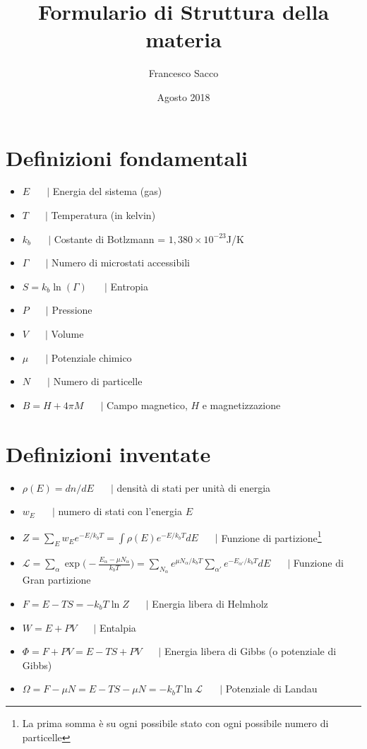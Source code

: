 \documentclass[10pt,a4paper]{article}
\author{Francesco Sacco}
\title{Formulario di Struttura della materia}
\newcommand{\exn}{\phantom{xxx}}
\begin{document}
\date{Agosto 2018}
\maketitle

\section{Definizioni fondamentali}
\begin{itemize}
	\item $E\exn |$ Energia del sistema (gas)
	\item $T\exn |$ Temperatura (in kelvin)
	\item $k_b\exn |$ Costante di Botlzmann = $1,380 \times 10^{-23}$J/K
	\item $\Gamma\exn |$ Numero di microstati accessibili
	\item $S=k_b\ln(\Gamma)\exn |$ Entropia
	\item $P\exn |$ Pressione
	\item $V\exn |$ Volume
	\item $\mu\exn |$ Potenziale chimico
	\item $N\exn |$ Numero di particelle
	\item $B=H+4\pi M\exn |$ Campo magnetico, $H$ e magnetizzazione
\end{itemize}

\section{Definizioni inventate}
\begin{itemize}
	\item $\rho(E)=dn/dE\exn |$ densità di stati per unità di energia
	\item $w_E\exn |$ numero di stati con l'energia $E$
	\item $Z=\sum_E w_E e^{-E/k_bT}=\int\rho(E)e^{-E/k_bT}dE\exn |$ Funzione di partizione\footnote{La prima somma è su ogni possibile stato con ogni possibile numero di particelle}
	\item $\mathscr L=\sum_\alpha \exp\big(-\frac{E_\alpha-\mu N_\alpha}{k_bT}\big)=
		\sum_{N_\alpha}e^{\mu N_\alpha/k_bT}\sum_{\alpha'}e^{-E_{\alpha'}/k_bT}dE\exn |$
		Funzione di Gran partizione
	\item $F=E-TS=-k_bT\ln Z\exn |$ Energia libera di Helmholz
	\item $W=E+PV\exn |$ Entalpia
	\item $\Phi=F+PV=E-TS+PV\exn |$ Energia libera di Gibbs (o potenziale di Gibbs) 
	\item $\Omega=F-\mu N=E-TS-\mu N=-k_bT\ln\mathscr L\exn |$ Potenziale di Landau
\end{itemize}
\end{document}
